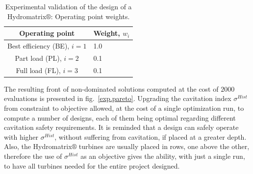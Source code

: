 \begin{table}[h!]
\begin{center}
\begin{tabular}{ |c|l| }
\hline
Operating point & Weight, $w_i$\\
\hline
Best efficiency (BE), $i\!=\!1$  & 1.0\\
\hline
Part load  (PL), $i\!=\!2$ & 0.1\\
\hline
Full load (FL), $i\!=\!3$  & 0.1\\
\hline
\end{tabular}
\caption{Experimental validation of the design of a Hydromatrix$\circledR$: Operating point weights.}
\label{exp.weights}
\end{center}
\end{table}

The resulting front of non-dominated solutions computed at the cost of $2000$ evaluations is presented in fig.\ \ref{exp.pareto}. Upgrading the cavitation index $\sigma^{Hist}$ from constraint to objective allowed, at the cost of a single optimization run, to compute a number of designs, each of them being optimal regarding different cavitation safety requirements. It is reminded that a design can safely operate with higher $\sigma^{Hist}$, without suffering from cavitation, if  placed at a greater depth. Also, the Hydromatrix$\circledR$ turbines are usually placed in  rows, one above the other, therefore the use of $\sigma^{Hist}$ as an objective gives the ability, with just a single run, to have all turbines needed for the entire project designed. 

